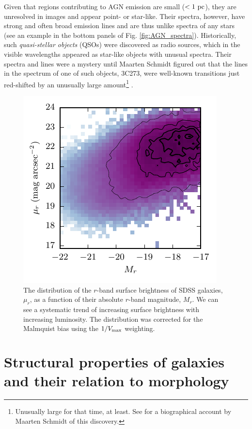 Given that regions contributing to AGN emission are small ($<1\ \rm pc$), they are unresolved in images and appear point- or star-like. Their spectra, however, have strong and often broad emission lines and are thus unlike spectra of any stars (see an example in the bottom panels of Fig. \ref{fig:AGN_spectra}). Historically, 
such {\it quasi-stellar objects} (QSOs) were discovered as radio sources, which in the visible wavelengths appeared as star-like objects with unusual spectra. Their spectra and lines were a mystery until Maarten Schmidt figured out that the lines in the spectrum of one of such objects, 3C273, were well-known transitions just red-shifted by an unusually large amount\footnote{Unusually large for that time, at least. See \href{http://www.annualreviews.org/doi/abs/10.1146/annurev-astro-082214-122514}{\citet{schmidt15}} for a biographical account by Maarten Schmidt of this discovery.} \href{http://adsabs.harvard.edu/abs/1963Natur.197.1040S}{\citep{schmidt63}}. 


\begin{figure}[t]
\centerline{
\includegraphics[scale=2.0]{fig/Mrmur.pdf}}
\caption{The distribution of the $r$-band surface brightness of SDSS galaxies, $\mu_r$, as a function of their absolute $r$-band magnitude, $M_r$.   We can see a systematic trend of increasing surface brightness with increasing luminosity. The distribution was corrected for the Malmquist bias using the $1/V_{\rm max}$ weighting. \label{fig:Mrmur}}
\end{figure}



\section{Structural properties of galaxies and their relation to morphology}

